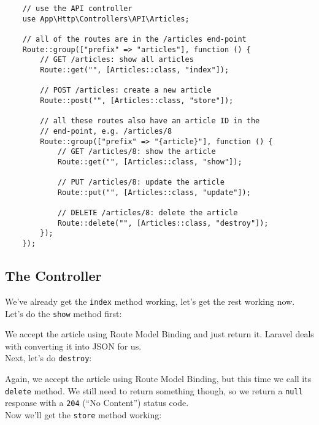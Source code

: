 \begin{verbatim}
    // use the API controller
    use App\Http\Controllers\API\Articles;

    // all of the routes are in the /articles end-point
    Route::group(["prefix" => "articles"], function () {
        // GET /articles: show all articles
        Route::get("", [Articles::class, "index"]);

        // POST /articles: create a new article
        Route::post("", [Articles::class, "store"]);

        // all these routes also have an article ID in the
        // end-point, e.g. /articles/8
        Route::group(["prefix" => "{article}"], function () {
            // GET /articles/8: show the article
            Route::get("", [Articles::class, "show"]);

            // PUT /articles/8: update the article
            Route::put("", [Articles::class, "update"]);

            // DELETE /articles/8: delete the article
            Route::delete("", [Articles::class, "destroy"]);
        });
    });
\end{verbatim}

\subsection{The Controller}

We've already get the \texttt{index} method working, let's get the rest working now.
\\

Let's do the \texttt{show} method first:


We accept the article using Route Model Binding and just return it. Laravel deals with converting it into JSON for us.
\\

Next, let's do \texttt{destroy}:


Again, we accept the article using Route Model Binding, but this time we call its \texttt{delete} method. We still need to return something though, so we return a \texttt{null} response with a \texttt{204} (``No Content'') status code.
\\

Now we'll get the \texttt{store} method working:



